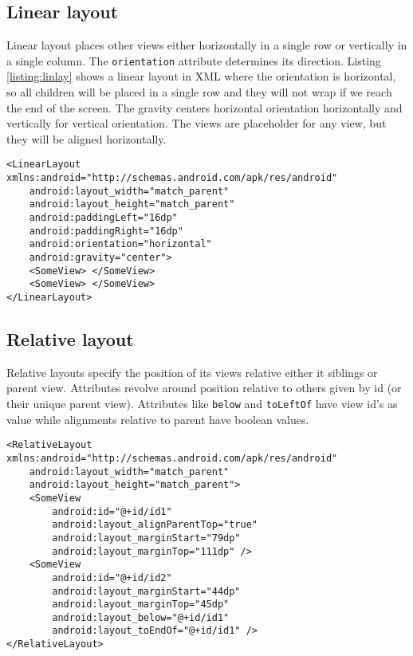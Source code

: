 \subsection{Linear layout}
Linear layout places other views either horizontally in a single row or vertically in a single column. The \texttt{orientation} attribute determines its direction. Listing \ref{listing:linlay} shows a linear layout in XML where the orientation is horizontal, so all children will be placed in a single row and they will not wrap if we reach the end of the screen. The gravity centers horizontal orientation horizontally and vertically for vertical orientation. The views are placeholder for any view, but they will be aligned horizontally.
\begin{lstlisting}[style=A_XML, caption={Linear layout declaration}, label = {listing:linlay}]
<LinearLayout xmlns:android="http://schemas.android.com/apk/res/android"
    android:layout_width="match_parent"
    android:layout_height="match_parent"
    android:paddingLeft="16dp"
    android:paddingRight="16dp"
    android:orientation="horizontal"
    android:gravity="center">
    <SomeView> </SomeView>
    <SomeView> </SomeView>
</LinearLayout>
\end{lstlisting}

\subsection{Relative layout}
Relative layouts specify the position of its views relative either it siblings or parent view. Attributes revolve around position relative to others given by id (or their unique parent view). Attributes like \texttt{below} and \texttt{toLeftOf} have view id's as value while alignments relative to parent have boolean values.
\begin{lstlisting}[style=A_XML, caption={Relative layout declaration}, label = {listing:rellay}]
<RelativeLayout xmlns:android="http://schemas.android.com/apk/res/android"
    android:layout_width="match_parent"
    android:layout_height="match_parent">
    <SomeView
        android:id="@+id/id1"
        android:layout_alignParentTop="true"
        android:layout_marginStart="79dp"
        android:layout_marginTop="111dp" />
    <SomeView
        android:id="@+id/id2"
        android:layout_marginStart="44dp"
        android:layout_marginTop="45dp"
        android:layout_below="@+id/id1"
        android:layout_toEndOf="@+id/id1" />
</RelativeLayout>
\end{lstlisting}

